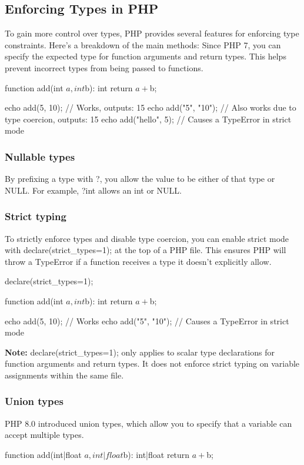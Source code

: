 \documentclass{report}
\begin{document}
\bigbreak \noindent 
\subsection{Enforcing Types in PHP}
\bigbreak \noindent 
To gain more control over types, PHP provides several features for enforcing type constraints. Here’s a breakdown of the main methods:
\bigbreak \noindent 
Since PHP 7, you can specify the expected type for function arguments and return types. This helps prevent incorrect types from being passed to functions.
\bigbreak \noindent 
\begin{phpcode}
function add(int $a, int $b): int {
    return $a + $b;
}

echo add(5, 10);      // Works, outputs: 15
echo add("5", "10");  // Also works due to type coercion, outputs: 15
echo add("hello", 5); // Causes a TypeError in strict mode
\end{phpcode}
\bigbreak \noindent 
\subsubsection{Nullable types}
\bigbreak \noindent 
By prefixing a type with ?, you allow the value to be either of that type or NULL. For example, ?int allows an int or NULL.

\bigbreak \noindent 
\subsubsection{Strict typing}
\bigbreak \noindent 
To strictly enforce types and disable type coercion, you can enable strict mode with declare(strict\_types=1); at the top of a PHP file. This ensures PHP will throw a TypeError if a function receives a type it doesn’t explicitly allow.
\bigbreak \noindent 
\begin{phpcode}
    declare(strict_types=1);

    function add(int $a, int $b): int {
        return $a + $b;
    }

    echo add(5, 10);         // Works
    echo add("5", "10");     // Causes a TypeError in strict mode
\end{phpcode}
\bigbreak \noindent 
\textbf{Note:} declare(strict\_types=1); only applies to scalar type declarations for function arguments and return types. It does not enforce strict typing on variable assignments within the same file.

\bigbreak \noindent 
\subsubsection{Union types}
\bigbreak \noindent 
PHP 8.0 introduced union types, which allow you to specify that a variable can accept multiple types.
\bigbreak \noindent 
\begin{phpcode}
    function add(int|float $a, int|float $b): int|float {
        return $a + $b;
    }
\end{phpcode}
\end{document}
